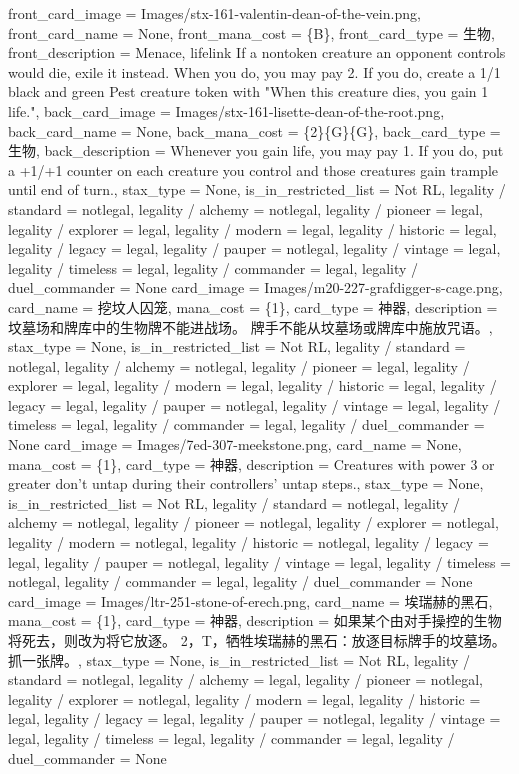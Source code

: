 \documentclass[lang = cn, color = black, 10pt]{AllThatStax}
\begin{document}
\mfcard
{
	front_card_image = Images/stx-161-valentin-dean-of-the-vein.png,
	front_card_name = None,
	front_mana_cost = \{B\},
	front_card_type = 生物,
	front_description = Menace, lifelink
	If a nontoken creature an opponent controls would die, exile it instead. When you do, you may pay {2}. If you do, create a 1/1 black and green Pest creature token with "When this creature dies, you gain 1 life.",
	back_card_image = Images/stx-161-lisette-dean-of-the-root.png,
	back_card_name = None,
	back_mana_cost = \{2\}\{G\}\{G\},
	back_card_type = 生物,
	back_description = Whenever you gain life, you may pay {1}. If you do, put a +1/+1 counter on each creature you control and those creatures gain trample until end of turn.,
	stax_type = None,
	is_in_restricted_list = Not RL,
	legality / standard = notlegal,
	legality / alchemy = notlegal,
	legality / pioneer = legal,
	legality / explorer = legal,
	legality / modern = legal,
	legality / historic = legal,
	legality / legacy = legal,
	legality / pauper = notlegal,
	legality / vintage = legal,
	legality / timeless = legal,
	legality / commander = legal,
	legality / duel_commander = None
}
\card
{
	card_image = Images/m20-227-grafdigger-s-cage.png,
	card_name = 挖坟人囚笼,
	mana_cost = \{1\},
	card_type = 神器,
	description = 坟墓场和牌库中的生物牌不能进战场。
	牌手不能从坟墓场或牌库中施放咒语。,
	stax_type = None,
	is_in_restricted_list = Not RL,
	legality / standard = notlegal,
	legality / alchemy = notlegal,
	legality / pioneer = legal,
	legality / explorer = legal,
	legality / modern = legal,
	legality / historic = legal,
	legality / legacy = legal,
	legality / pauper = notlegal,
	legality / vintage = legal,
	legality / timeless = legal,
	legality / commander = legal,
	legality / duel_commander = None
}
\card
{
	card_image = Images/7ed-307-meekstone.png,
	card_name = None,
	mana_cost = \{1\},
	card_type = 神器,
	description = Creatures with power 3 or greater don't untap during their controllers' untap steps.,
	stax_type = None,
	is_in_restricted_list = Not RL,
	legality / standard = notlegal,
	legality / alchemy = notlegal,
	legality / pioneer = notlegal,
	legality / explorer = notlegal,
	legality / modern = notlegal,
	legality / historic = notlegal,
	legality / legacy = legal,
	legality / pauper = notlegal,
	legality / vintage = legal,
	legality / timeless = notlegal,
	legality / commander = legal,
	legality / duel_commander = None
}
\card
{
	card_image = Images/ltr-251-stone-of-erech.png,
	card_name = 埃瑞赫的黑石,
	mana_cost = \{1\},
	card_type = 神器,
	description = 如果某个由对手操控的生物将死去，则改为将它放逐。
	{2}，{T}，牺牲埃瑞赫的黑石：放逐目标牌手的坟墓场。抓一张牌。,
	stax_type = None,
	is_in_restricted_list = Not RL,
	legality / standard = notlegal,
	legality / alchemy = legal,
	legality / pioneer = notlegal,
	legality / explorer = notlegal,
	legality / modern = legal,
	legality / historic = legal,
	legality / legacy = legal,
	legality / pauper = notlegal,
	legality / vintage = legal,
	legality / timeless = legal,
	legality / commander = legal,
	legality / duel_commander = None
}
\end{document}
